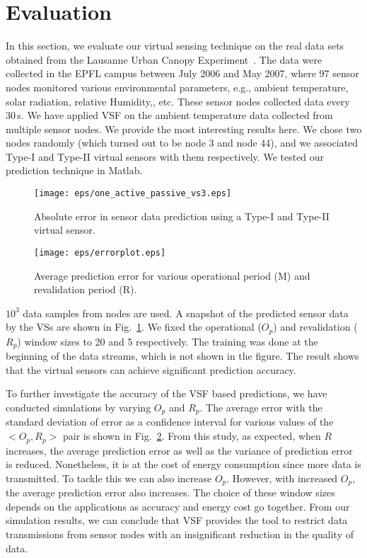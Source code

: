 \documentclass[a4paper,conference]{IEEEtran}
\begin{document}
\section{Evaluation}
\label{eva}
In this section, we evaluate our virtual sensing technique on the real data sets obtained from the Lausanne Urban Canopy Experiment~\cite{sensorscope}. The data were collected in the EPFL campus between July 2006 and May 2007, where 97 sensor nodes monitored various environmental parameters, e.g., ambient temperature, solar radiation, relative Humidity,, etc. These sensor nodes collected data every 30\,s. We have applied VSF on the ambient temperature data collected from multiple sensor nodes. We provide the most interesting results here. We chose two nodes randomly (which turned out to be node 3 and node 44), and we associated Type-I and Type-II virtual sensors with them respectively. We tested our prediction technique in Matlab.
\begin{figure}[]
\centering
\texttt{[image: eps/one\_active\_passive\_vs3.eps]}
\caption{Absolute error in sensor data prediction using a Type-I and Type-II virtual sensor.}
\label{fig:prediction}
\end{figure}
\begin{figure}[]
\centering
\texttt{[image: eps/errorplot.eps]}
\caption{Average prediction error for various operational period (M) and revalidation period (R).}
\label{fig:errorplot}
\end{figure}
$10^3$ data samples from nodes are used. A snapshot of the predicted sensor data by the VSs are shown in Fig.~\ref{fig:prediction}. We fixed the operational ($O_{p}$) and revalidation ($R_{p}$) window sizes to 20 and 5 respectively.  The training was done at the beginning of the data streams, which is not shown in the figure. The result shows that the virtual sensors can achieve significant prediction accuracy.

To further investigate the accuracy of the VSF based predictions, we have conducted simulations by varying $O_{p}$ and $R_{p}$. The average error with the standard deviation of error as a confidence interval for various values of the $<O_{p},R_{p}>$ pair is shown in Fig.~\ref{fig:errorplot}. From this study, as expected, when $R$ increases, the average prediction error as well as the variance of prediction error is reduced. Nonetheless, it is at the cost of energy consumption since more data is transmitted. To tackle this we can also increase $O_{p}$. However, with increased $O_{p}$, the average prediction error also increases. The choice of these window sizes depends on the applications as accuracy and energy cost go together. From our simulation results, we can conclude that VSF provides the tool to restrict data transmissions from sensor nodes with an insignificant reduction in the quality of data.
\end{document}
